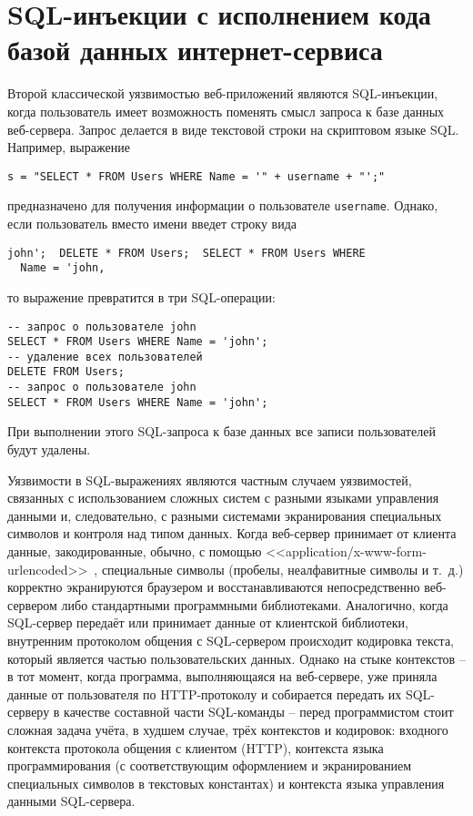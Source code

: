 \section[SQL-инъекции с исполнением кода веб-сервером]{SQL-инъекции с исполнением кода \protect\\ базой данных интернет-сервиса}

Второй классической уязвимостью веб-приложений являются SQL-инъекции, когда пользователь имеет возможность поменять смысл запроса к базе данных веб-сервера. Запрос делается в виде текстовой строки на скриптовом языке SQL. Например, выражение
\begin{verbatim}
s = "SELECT * FROM Users WHERE Name = '" + username + "';"
\end{verbatim}
предназначено для получения информации о пользователе \texttt{username}. Однако, если пользователь вместо имени введет строку вида
\begin{center} \begin{verbatim}
john';  DELETE * FROM Users;  SELECT * FROM Users WHERE
  Name = 'john,
\end{verbatim} \end{center}
то выражение превратится в три SQL-операции:
\begin{verbatim}
-- запрос о пользователе john
SELECT * FROM Users WHERE Name = 'john';
-- удаление всех пользователей
DELETE FROM Users;
-- запрос о пользователе john
SELECT * FROM Users WHERE Name = 'john';
\end{verbatim}
При выполнении этого SQL-запроса к базе данных все записи пользователей будут удалены.

Уязвимости в SQL-выражениях являются частным случаем уязвимостей, связанных с использованием сложных систем с разными языками управления данными и, следовательно, с разными системами экранирования специальных символов и контроля над типом данных. Когда веб-сервер принимает от клиента данные, закодированные, обычно, с помощью <<application/x-www-form-urlencoded>>~\cite{html4:1999}, специальные символы (пробелы, неалфавитные символы и т.~д.) корректно экранируются браузером и восстанавливаются непосредственно веб-сервером либо стандартными программными библиотеками. Аналогично, когда SQL-сервер передаёт или принимает данные от клиентской библиотеки, внутренним протоколом общения с SQL-сервером происходит кодировка текста, который является частью пользовательских данных. Однако на стыке контекстов -- в тот момент, когда программа, выполняющаяся на веб-сервере, уже приняла данные от пользователя по HTTP-протоколу и собирается передать их SQL-серверу в качестве составной части SQL-команды -- перед программистом стоит сложная задача учёта, в худшем случае, трёх контекстов и кодировок: входного контекста протокола общения с клиентом (HTTP), контекста языка программирования (с соответствующим оформлением и экранированием специальных символов в текстовых константах) и контекста языка управления данными SQL-сервера.

